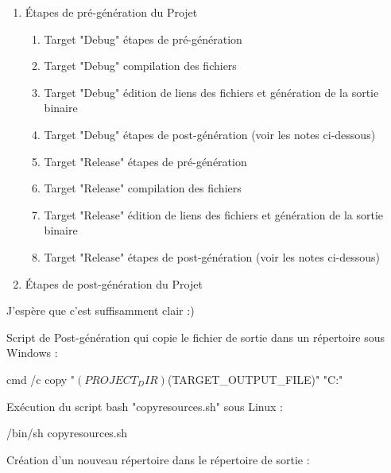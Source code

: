 \begin{enumerate}
\item Étapes de pré-génération du Projet
    \begin{enumerate}
    \item Target "Debug" étapes de pré-génération
    \item Target "Debug" compilation des fichiers
    \item Target "Debug" édition de liens des fichiers et génération de la sortie binaire
    \item Target "Debug" étapes de post-génération (voir les notes ci-dessous)
    \item Target "Release" étapes de pré-génération
    \item Target "Release" compilation des fichiers
    \item Target "Release" édition de liens des fichiers et génération de la sortie binaire
    \item Target "Release" étapes de post-génération (voir les notes ci-dessous)
    \end{enumerate}
\item Étapes de post-génération du Projet
\end{enumerate}

J'espère que c'est suffisamment clair :)



Script de Post-génération qui copie le fichier de sortie dans un répertoire  sous Windows : 

\begin{code}
cmd /c copy "$(PROJECT_DIR)$(TARGET_OUTPUT_FILE)" "C:\Program\bin"
\end{code}

Exécution du script bash "copyresources.sh" sous Linux :

\begin{code}
/bin/sh copyresources.sh
\end{code}

Création d'un nouveau répertoire dans le répertoire de sortie :

